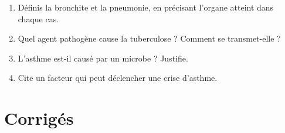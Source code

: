 \begin{enumerate}[label=\arabic*)]
\item Définis la bronchite et la pneumonie, en précisant l'organe atteint dans
chaque cas.
\item Quel agent pathogène cause la tuberculose ? Comment se transmet-elle ?
\item L'asthme est-il causé par un microbe ? Justifie.
\item Cite un facteur qui peut déclencher une crise d'asthme.
\end{enumerate}

\section{Corrigés}
